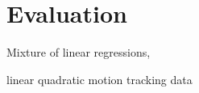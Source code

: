 \section{Evaluation}
\label{sec:evaluation}

Mixture of linear regressions, 

linear 
quadratic
motion tracking data


